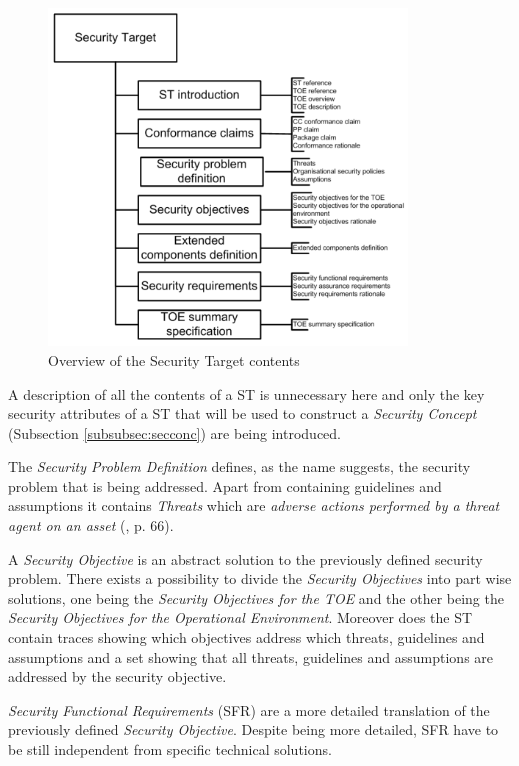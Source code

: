 \begin{figure}[H]
\centering
\includegraphics[width=0.85\textwidth]{pictures/sectarget.png}
\caption{Overview of the Security Target contents}
\label{fig:sectarget}
\end{figure}

A description of all the contents of a ST is unnecessary here and only the key security attributes of a ST that will be used to construct a \textit{Security Concept} (Subsection \ref{subsubsec:secconc}) are being introduced.

The \textit{Security Problem Definition} defines, as the name suggests, the security problem that is being addressed. Apart from containing guidelines and assumptions it contains \textit{Threats} which are \textit{\glqq[...] adverse actions performed by a threat agent on an asset\grqq} (\cite{iso27001}, p. 66).

A \textit{Security Objective} is an abstract solution to the previously defined security problem. There exists a possibility to divide the \textit{Security Objectives} into part wise solutions, one being the \textit{Security Objectives for the TOE} and the other being the \textit{Security Objectives for the Operational Environment}. Moreover does the ST contain traces showing which objectives address which threats, guidelines and assumptions and a set showing that all threats, guidelines and assumptions are addressed by the security objective.

\textit{Security Functional Requirements} (SFR) are a more detailed translation of the previously defined \textit{Security Objective}. Despite being more detailed, SFR have to be still independent from specific technical solutions. 

